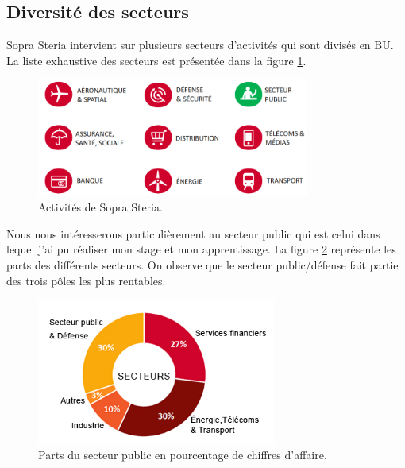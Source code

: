 \documentclass[12pt,a4paper]{article}
\begin{document}
\subsection{Diversité des secteurs}
Sopra Steria intervient sur plusieurs secteurs d’activités qui sont divisés en \gls{BU}. La liste exhaustive des secteurs est présentée dans la figure \ref{secteurs}.
\smallbreak
\begin{figure}[H]
	\begin{center}		\includegraphics[width=0.80\textwidth,height=0.80\textheight,keepaspectratio]{secteursActivites.png}
		\caption{Activités de Sopra Steria.}
		\label{secteurs}
	\end{center}
\end{figure}
Nous nous intéresserons particulièrement au secteur public qui est celui dans lequel j'ai pu réaliser mon stage et mon apprentissage. La figure \ref{parts} représente les parts des différents secteurs. On observe que le secteur public/défense fait partie des trois pôles les plus rentables.
\smallbreak
\begin{figure}[H]
	\begin{center}	\includegraphics[width=0.7\textwidth,height=0.8\textheight,keepaspectratio]{secteursSopra.png}
		\caption{Parts du secteur public en pourcentage de chiffres d'affaire.}
		\label{parts}
	\end{center}
\end{figure}
\clearpage
\newpage
\end{document}
